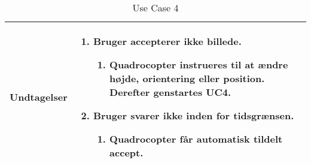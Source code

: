 \begin{table}[H]
\begin{tabular}{| p{3cm}| p{11.5cm}|}
Undtagelser							& 

									\renewcommand{\labelenumi}{\Roman{enumi}:}
									\renewcommand{\labelenumii}{\alph{enumii})}
									\begin{enumerate}[topsep=0.0cm,leftmargin=0.5cm]
										\item Bruger accepterer ikke billede.
											\begin{enumerate}[topsep=0cm, leftmargin=1cm]
												\item Quadrocopter instrueres til at ændre højde, orientering eller position. Derefter genstartes UC4.
											\end{enumerate}
										\item Bruger svarer ikke inden for tidsgrænsen.
											\begin{enumerate}[topsep=0cm, leftmargin=1cm]
												\item Quadrocopter får automatisk tildelt accept.
											\end{enumerate}
									\end{enumerate} \\\hline	

\end{tabular}
\caption{Use Case 4}
\label{tab:UC4}
\end{table}